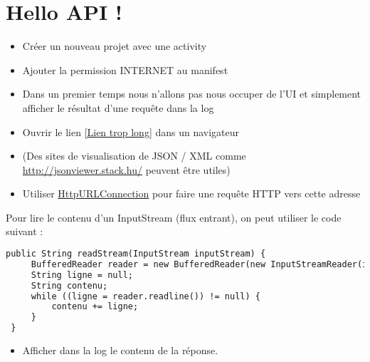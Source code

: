 \documentclass{article}
\begin{document}
\section{Hello API !}
\begin{itemize} 
  \item Créer un nouveau projet avec une activity
  \item Ajouter la permission INTERNET au manifest
  \item Dans un premier temps nous n'allons pas nous occuper de l'UI et simplement afficher le résultat d'une requête dans la log
  \item Ouvrir le lien  \href{http://data.keolis-rennes.com/json/?version=2.0\&key=1RJLZ38TUFZSWTW\&cmd=getbikestations\&station=all}{[Lien trop long]} dans un navigateur
  \item (Des sites de visualisation de JSON / XML comme \href{http://jsonviewer.stack.hu/}{http://jsonviewer.stack.hu/} peuvent être utiles)
  \item Utiliser \href{http://developer.android.com/reference/java/net/HttpURLConnection.html}{HttpURLConnection} pour faire une requête HTTP vers cette adresse
\end{itemize}
Pour lire le contenu d'un InputStream (flux entrant), on peut utiliser le code suivant :
 \begin{lstlisting}[language=XML]
 public String readStream(InputStream inputStream) {
     BufferedReader reader = new BufferedReader(new InputStreamReader(inputStream);
     String ligne = null;
     String contenu;
     while ((ligne = reader.readline()) != null) {
         contenu += ligne;
     }
 }
\end{lstlisting}
\begin{itemize} 
  \item Afficher dans la log le contenu de la réponse.
\end{itemize}
\end{document}
